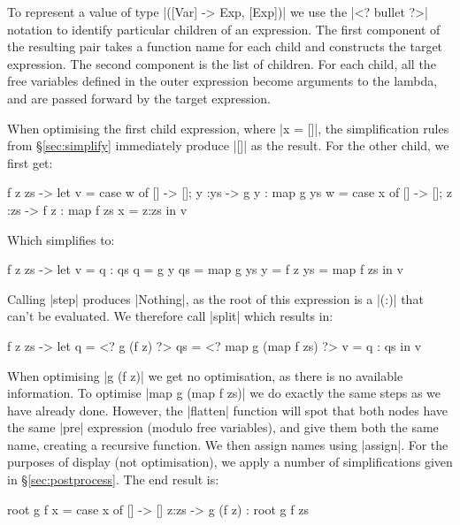 \documentclass[draft]{sigplanconf}
\begin{document}
To represent a value of type |([Var] -> Exp, [Exp])| we use the |<? bullet ?>| notation to identify particular children of an expression. The first component of the resulting pair takes a function name for each child and constructs the target expression. The second component is the list of children. For each child, all the free variables defined in the outer expression become arguments to the lambda, and are passed forward by the target expression.

When optimising the first child expression, where |x = []|, the simplification rules from \S\ref{sec:simplify} immediately produce |[]| as the result. For the other child, we first get:

\begin{code}
\g f z zs ->
    let  v = case  w  of [] -> []; y  :ys  -> g  y  : map g  ys
         w = case  x  of [] -> []; z  :zs  -> f  z  : map f  zs
         x = z:zs
    in   v
\end{code}

Which simplifies to:

\begin{code}
\g f z zs ->  let  v = q : qs
                   q = g y
                   qs = map g ys
                   y = f z
                   ys = map f zs
              in   v
\end{code}

Calling |step| produces |Nothing|, as the root of this expression is a |(:)| that can't be evaluated. We therefore call |split| which results in:

\begin{code}
\g f z zs ->  let  q = <? g (f z) ?>
                   qs = <? map g (map f zs) ?>
                   v = q : qs
              in   v
\end{code}

When optimising |g (f z)| we get no optimisation, as there is no available information. To optimise |map g (map f zs)| we do exactly the same steps as we have already done. However, the |flatten| function will spot that both nodes have the same |pre| expression (modulo free variables), and give them both the same name, creating a recursive function. We then assign names using |assign|. For the purposes of display (not optimisation), we apply a number of simplifications given in \S\ref{sec:postprocess}. The end result is:

\begin{code}
root g f x = case  x of
                   []    -> []
                   z:zs  -> g (f z) : root g f zs
\end{code}
\end{document}
